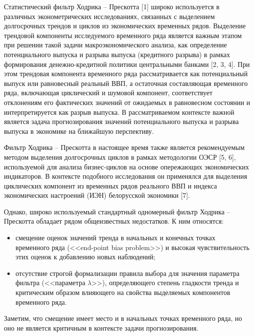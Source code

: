 \documentclass[a4paper,14pt]{extreport}
\begin{document}
	Статистический фильтр Ходрика – Прескотта [1] широко используется в различных эконометрических исследованиях, связанных с выделением долгосрочных трендов и циклов из экономических временных рядов. Выделение трендовой компоненты исследуемого временного ряда является важным этапом при решении такой задачи макроэкономического анализа, как определение потенциального выпуска и разрыва выпуска (кредитного разрыва) в рамках формирования денежно-кредитной политики центральными банками [2, 3, 4]. При этом трендовая компонента временного ряда рассматривается как потенциальный выпуск или равновесный реальный ВВП, а остаточная составляющая временного ряда, включающая циклический и шумовой компонент,  соответствует отклонениям его фактических значений  от ожидаемых в равновесном состоянии и интерпретируется как разрыв выпуска. В рассматриваемом контексте важной является задача прогнозирования значений потенциального выпуска и разрыва выпуска в экономике на ближайшую перспективу. 
	
	Фильтр Ходрика – Прескотта в настоящее время также является рекомендуемым методом выделения долгосрочных циклов в рамках методологии ОЭСР [5, 6], используемой для анализа бизнес-циклов на основе опережающих экономических индикаторов. В контексте подобного исследования он применялся для выделения циклических компонент из временных рядов реального ВВП и индекса экономических настроений (ИЭН) белорусской экономики [7]. 
	
	Однако, широко используемый стандартный одномерный фильтр Ходрика – Прескотта обладает рядом общеизвестных недостатков.  К ним относятся: 
	
	\begin{itemize}
		\item смещение оценок значений тренда в начальных и конечных точках временного ряда (<<end-point bias problem>>) и высокая чувствительность этих оценок к добавлению новых наблюдений; 
		\item отсутствие строгой формализации правила выбора для значения параметра фильтра (<<параметра $\lambda$>>), определяющего степень гладкости тренда и критическим образом влияющего на свойства выделяемых компонентов временного ряда.
	\end{itemize}
	
	Заметим, что смещение имеет место и в начальных точках временного ряда, но оно не является критичным в контексте задачи прогнозирования.
	
\end{document}
